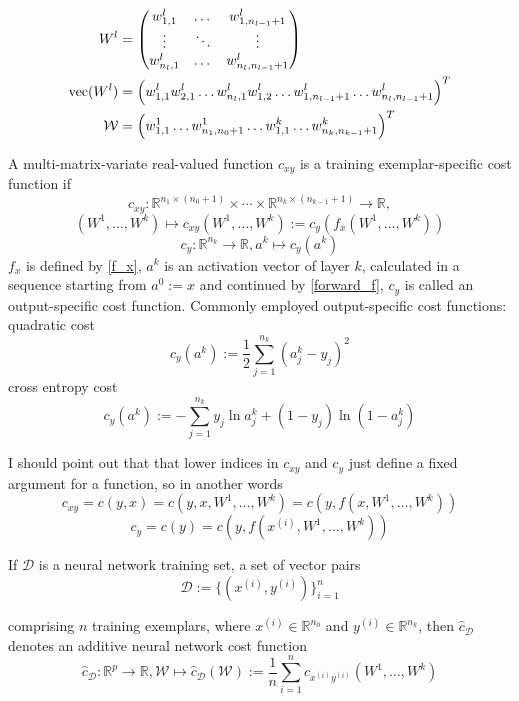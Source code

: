 \documentclass[draft]{article}
\def\RealSet{\mathbb{R}}
\DeclareMathOperator{\vect}{vec}
\begin{document}
\begin{align}
W^l &= \begin{pmatrix}
w^l_{1,1} & \dots & w^l_{1,n_{l-1}+1} \\
\vdots & \ddots & \vdots \\
w^l_{n_{l},1} & \dots & w^l_{n_{l},n_{l-1}+1}
\end{pmatrix} \\
\vect(W^l) &= \Bigl( w^l_{1,1} w^l_{2,1} \dots w^l_{n_{l},1} w^l_{1,2} \dots w^l_{1,n_{l-1}+1} \dots w^l_{n_{l},n_{l-1}+1}\Bigr)^T \\
\mathcal{W} &= \Bigl( w^1_{1,1} \dots w^1_{n_1,n_0+1} \dots  w^k_{1,1} \dots w^k_{n_k,n_{k-1}+1} \Bigr)^T
\end{align}


A multi-matrix-variate real-valued function $c_{xy}$ is a training exemplar-specific cost function if
\[
c_{xy} \colon \RealSet^{n_1 \times (n_0 + 1)} \times \cdots \times \RealSet^{n_k \times (n_{k-1} + 1)} \rightarrow \RealSet,
\]
\begin{equation}\label{output_specific_cost_function}
(W^1,\dots,W^k) \mapsto c_{xy}(W^1,\dots,W^k) := c_y(f_x(W^1,\dots,W^k))
\end{equation}
\[
c_y \colon \RealSet^{n_k} \rightarrow \RealSet, a^k \mapsto c_y(a^k)
\]
$f_x$ is defined by \eqref{f_x}, $a^k$ is an activation vector of layer $k$, calculated in a sequence starting from $a^0 := x$ and continued by \eqref{forward_f}, $c_y$ is called an output-specific cost function.
Commonly employed output-specific cost functions: quadratic cost
\[
c_y(a^k) := \frac{1}{2}\sum_{j=1}^{n_k}(a_j^k - y_j)^2
\]
cross entropy cost
\[
  c_y(a^k) := - \sum_{j=1}^{n_k}y_j \ln a_j^k + (1-y_j)\ln(1-a_j^k)
\]

I should point out that that lower indices in $c_{xy}$ and $c_y$ just define a fixed argument for a function, so in another words
\[
c_{xy} = c(y, x) = c(y, x, W^1,\dots,W^k) = c(y, f(x, W^1,\dots,W^k))
\]
\[
c_y = c(y) = c(y, f(x^{(i)}, W^1,\dots,W^k))
\]

If $\mathcal{D}$ is a neural network training set, a set of vector pairs
\[
\mathcal{D} := \bigl\{ (x^{(i)}, y^{(i)}) \bigr\}_{i=1}^n
\]

comprising $n$ training exemplars, where $x^{(i)} \in \RealSet^{n_0}$ and $y^{(i)} \in \RealSet^{n_k}$, then $\hat c_{\mathcal{D}}$ denotes an additive neural network cost function
\[
\hat c_{\mathcal{D}} \colon \RealSet^p \rightarrow \RealSet, \mathcal{W}\mapsto \hat c_{\mathcal{D}}(\mathcal{W}) := \frac{1}{n} \sum_{i=1}^{n}c_{x^{(i)}y^{(i)}}(W^1,\dots,W^k)
\]
\end{document}
